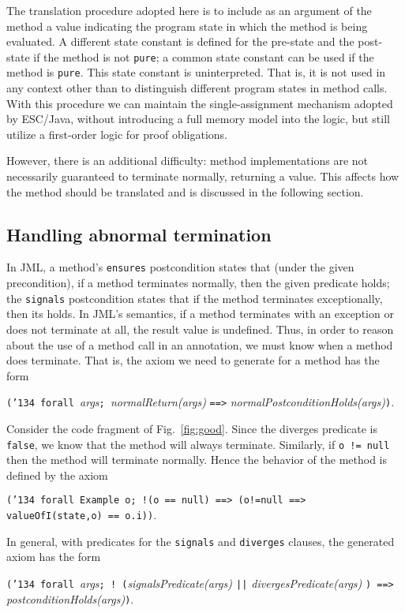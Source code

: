 \documentclass{sig-alternate}
\begin{document}
The translation procedure adopted here is to include as an argument of the 
method a value indicating the
program state in which the method is being evaluated.  A different state constant is defined
for the pre-state and the post-state if the method is not \texttt{pure}; a common state
constant can be used if the method is \texttt{pure}.  This state constant is uninterpreted.
That is, it is not used in any context other than to distinguish different program states 
in method calls.
With this procedure we can maintain the single-assignment mechanism adopted by ESC/Java,
without introducing a full memory model into the logic,
but still utilize a first-order logic for proof obligations.

However, there is an additional difficulty: 
method implementations are not necessarily guaranteed to terminate normally,
returning a value.  This affects how the method should
 be translated and is discussed in the following section.

\subsection{Handling abnormal termination}
\label{sec:abnormal}

In JML, a method's \texttt{ensures} postcondition states that (under the given precondition), if a method terminates normally, then the given predicate holds; the \texttt{signals} postcondition states that if the method terminates exceptionally, then its holds.  In JML's
semantics, if a method terminates with an exception or does not terminate at all, the result value
is undefined.
Thus, in order to reason about the use of a method call in an annotation, we must know when a method does terminate.  That is, the
axiom we need to generate for a method has the form
\begin{center} \texttt{(\char'134 forall }{\em args}\texttt{; }{\em normalReturn(args) }\texttt{==>} {\em normalPostconditionHolds(args)}\texttt{)}.\end{center}

Consider the code fragment of Fig.~\ref{fig:good}.   Since the diverges predicate is \texttt{false},
we know that the method will always terminate.  Similarly, if \texttt{o != null} then the method
will terminate normally.  Hence the behavior of the method is defined by the axiom
\begin{center}\texttt{(\char'134 forall Example o; !(o == null) ==> (o!=null ==> valueOfI(state,o) == o.i))}.\end{center}
In general, with predicates for the \texttt{signals} and \texttt{diverges} clauses, the 
generated axiom has the form
\begin{center} \texttt{(\char'134 forall }{\em args}\texttt{;  ! (}{\em signalsPredicate(args) {\tt ||} divergesPredicate(args) }\texttt{) ==>} {\em postconditionHolds(args)}\texttt{)}.\end{center}
\end{document}
